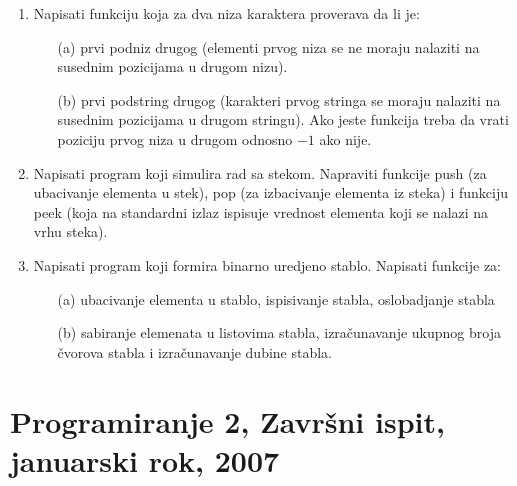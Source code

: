 \begin{enumerate}

\item
Napisati funkciju koja za dva niza karaktera proverava da li je:
\begin{itemize}
\item [(a)]
prvi podniz drugog (elementi prvog niza se ne moraju nalaziti na susednim
pozicijama u drugom nizu).
\item [(b)]
prvi podstring drugog (karakteri prvog stringa se moraju nalaziti na susednim
pozicijama u drugom stringu).
Ako jeste funkcija treba da vrati poziciju prvog niza u drugom odnosno $-1$ ako
nije.
\end{itemize}

\item
Napisati program koji simulira rad sa stekom. Napraviti funkcije push (za
ubacivanje elementa u stek), pop (za izbacivanje elementa iz steka) i
funkciju peek (koja na standardni izlaz ispisuje vrednost elementa koji se nalazi
na vrhu steka).

\item
Napisati program koji formira binarno uredjeno stablo. Napisati funkcije za:
\begin{itemize}
\item [(a)]
ubacivanje elementa u stablo, ispisivanje stabla, oslobadjanje stabla
\item [(b)]
sabiranje elemenata u listovima stabla, izra\v cunavanje ukupnog broja \v cvorova
stabla i izra\v cunavanje dubine stabla.
\end{itemize}
\end{enumerate}




\section{Programiranje 2, Zavr\v{s}ni ispit, januarski rok, 2007}


